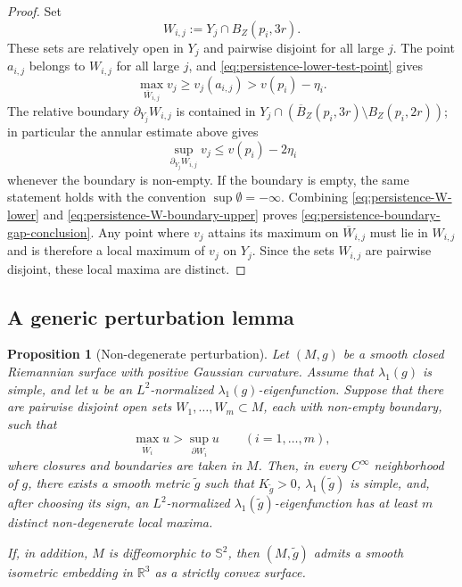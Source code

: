 \documentclass[11pt]{amsart}
\newtheorem{proposition}[theorem]{Proposition}
\numberwithin{equation}{section}
\newcommand{\R}{\mathbb R}
\begin{document}
\begin{proof}
Set
$$
W_{i,j}:=Y_j\cap B_Z(p_i,3r).
$$
These sets are relatively open in $Y_j$ and pairwise disjoint for all large $j$.
The point $a_{i,j}$ belongs to $W_{i,j}$ for all large $j$, and
\eqref{eq:persistence-lower-test-point} gives
\begin{equation}\label{eq:persistence-W-lower}
\max_{\overline W_{i,j}}v_j\ge v_j(a_{i,j})>v(p_i)-\eta_i .
\end{equation}
The relative boundary $\partial_{Y_j}W_{i,j}$ is contained in
$Y_j\cap(\overline B_Z(p_i,3r)\setminus B_Z(p_i,2r))$; in particular the
annular estimate above gives
\begin{equation}\label{eq:persistence-W-boundary-upper}
\sup_{\partial_{Y_j}W_{i,j}}v_j\le v(p_i)-2\eta_i
\end{equation}
whenever the boundary is non-empty.  If the boundary is empty, the same statement
holds with the convention $\sup\emptyset=-\infty$.  Combining
\eqref{eq:persistence-W-lower} and
\eqref{eq:persistence-W-boundary-upper} proves
\eqref{eq:persistence-boundary-gap-conclusion}.  Any point where $v_j$ attains
its maximum on $\overline W_{i,j}$ must lie in $W_{i,j}$ and is therefore a local
maximum of $v_j$ on $Y_j$.  Since the sets $W_{i,j}$ are pairwise disjoint, these
local maxima are distinct.
\end{proof}

\subsection{A generic perturbation lemma}

\begin{proposition}[Non-degenerate perturbation]\label{prop:nondegenerate-perturbation}
Let $(M,g)$ be a smooth closed Riemannian surface with positive Gaussian
curvature.  Assume that $\lambda_1(g)$ is simple, and let $u$ be an
$L^2$-normalized $\lambda_1(g)$-eigenfunction.  Suppose that there are pairwise
disjoint open sets $W_1,\ldots,W_m\subset M$, each with non-empty boundary, such
that
\begin{equation}\label{eq:nondegenerate-perturbation-gap}
\max_{\overline W_i}u>
\sup_{\partial W_i}u
\qquad(i=1,\ldots,m),
\end{equation}
where closures and boundaries are taken in $M$.  Then, in every $C^\infty$
neighborhood of $g$, there exists a smooth metric $\widetilde g$ such that
$K_{\widetilde g}>0$, $\lambda_1(\widetilde g)$ is simple, and, after choosing
its sign, an $L^2$-normalized $\lambda_1(\widetilde g)$-eigenfunction has at
least $m$ distinct non-degenerate local maxima.

If, in addition, $M$ is diffeomorphic to $\mathbb S^2$, then $(M,\widetilde g)$
admits a smooth isometric embedding in $\R^3$ as a strictly convex surface.
\end{proposition}
\end{document}
